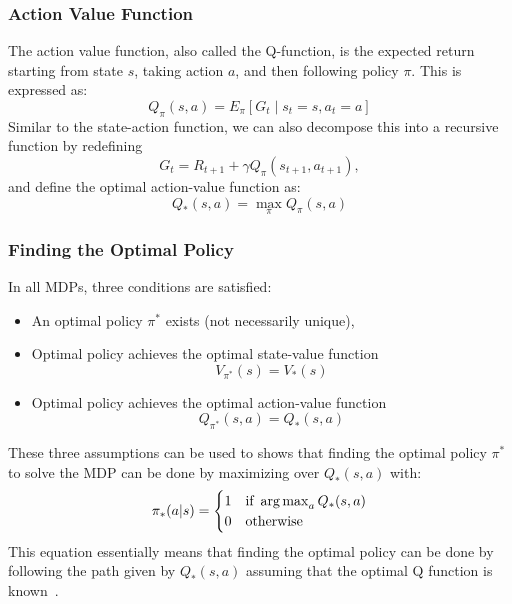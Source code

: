 \subsubsection{Action Value Function}
The action value function, also called the Q-function, is the expected return starting from state \(s\), taking action \(a\), and then following policy \(\pi \). This is expressed as:
\begin{equation}
    Q_\pi(s,a) = E_\pi[G_t \;|\; s_t = s, a_t = a]
\end{equation}
Similar to the state-action function, we can also decompose this into a recursive function by redefining
\begin{equation}
    G_{t} = R_{t+1} + \gamma Q_\pi(s_{t+1}, a_{t+1}),
\end{equation}
and define the optimal action-value function as:
\begin{equation}
    Q_*(s,a) = \max_\pi{Q_\pi(s,a)}
\end{equation}

\subsubsection{Finding the Optimal Policy}
In all MDPs, three conditions are satisfied:
\begin{itemize}
    \item An optimal policy \(\pi^*\) exists (not necessarily unique),
    \item Optimal policy achieves the optimal state-value function
          \begin{equation}
              V_{\pi^*}(s) = V_*(s)
          \end{equation}
    \item Optimal policy achieves the optimal action-value function
          \begin{equation}
              Q_{\pi^*}(s,a) = Q_*(s, a)
          \end{equation}
\end{itemize}
These three assumptions can be used to shows that finding the optimal policy
\(\pi^*\) to solve the MDP can be done by maximizing over \(Q_*(s,a)\) with:
\begin{equation}
    \pi_*(a | s) =
    \begin{cases}
        1 & \text{if }\operatorname*{arg\,max}_{a}{Q_*(s,a)} \\
        0 & \text{otherwise}
    \end{cases}
\end{equation}
This equation essentially means that finding the optimal policy can be done by
following the path given by \(Q_*(s,a)\) assuming that the optimal Q function is known~\autocite{mnih2013playing}.


